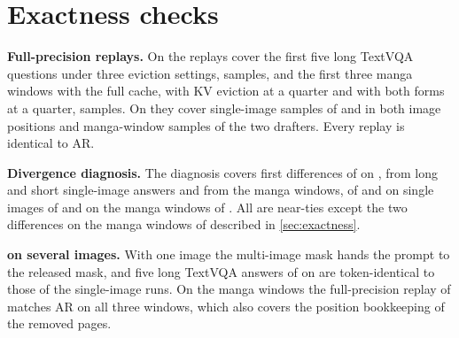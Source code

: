 \FloatBarrier
\section{Exactness checks}
\label{sec:exact-details}

\noindent\textbf{Full-precision replays.}
On \qwenS the replays cover the first five long TextVQA questions under three eviction settings, \fpqTbSingle samples, and the first three manga windows with the full cache, with KV eviction at a quarter and with both forms at a quarter, \fpqTbPages samples.
On \qwenL they cover \fpqSbSingle single-image samples of \vispec and \hivis in both image positions and \fpqSbPages manga-window samples of the two drafters.
Every replay is identical to AR.

\noindent\textbf{Divergence diagnosis.}
The diagnosis covers \diagCasesTb first differences of \vispec on \qwenS, from long and short single-image answers and from the manga windows, \diagCasesSb of \vispec and \hivis on single images of \qwenL and \diagCasesSbPages on the manga windows of \qwenL.
All are near-ties except the two differences on the manga windows of \qwenL described in \cref{sec:exactness}.

\noindent\textbf{\hivis on several images.}
With one image the multi-image mask hands the prompt to the released mask, and five long TextVQA answers of \hivis on \qwenL are token-identical to those of the single-image runs.
On the manga windows the full-precision replay of \hivis matches AR on all three windows, which also covers the position bookkeeping of the removed pages.
